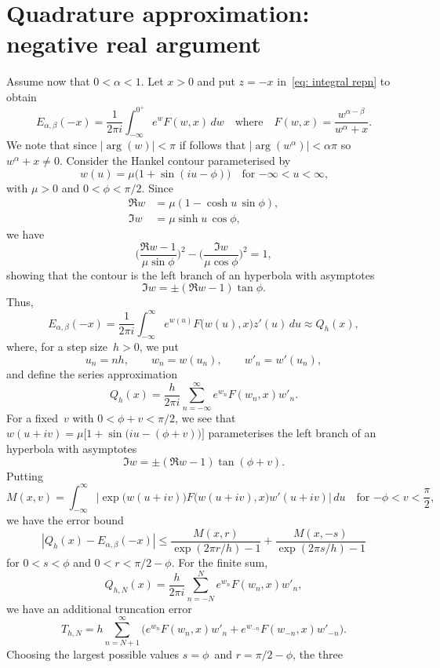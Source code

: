 \documentclass[12pt,a4paper]{article}
\begin{document}
\section{Quadrature approximation: negative real argument}\label{sec: quad neg}
Assume now that $0<\alpha<1$. Let $x>0$ and put $z=-x$ 
in~\eqref{eq: integral repn} to obtain
\[
E_{\alpha,\beta}(-x)=\frac{1}{2\pi i}\int_{-\infty}^{0^+}
    e^wF(w,x)\,dw
\quad\text{where}\quad
F(w,x)=\frac{w^{\alpha-\beta}}{w^\alpha+x}.
\]
We note that since $|\arg(w)|<\pi$ if follows that $|\arg(w^\alpha)|<\alpha\pi$
so $w^\alpha+x\ne0$.  Consider the Hankel contour parameterised 
by~\cite{WeidemanTrefethen2007}
\[
w(u)=\mu\bigl(1+\sin(iu-\phi)\bigr)\quad\text{for $-\infty<u<\infty$,}
\]
with $\mu>0$ and $0<\phi<\pi/2$. Since
\begin{align*}
\Re w&=\mu(1-\cosh u\,\sin\phi),\\
\Im w&=\mu\sinh u\,\cos\phi,
\end{align*}
we have
\[
\biggl(\frac{\Re w-1}{\mu\sin\phi}\biggr)^2
    -\biggl(\frac{\Im w}{\mu\cos\phi}\biggr)^2=1,
\]
showing that the contour is the left branch of an hyperbola with asymptotes
\[
\Im w=\pm(\Re w-1)\tan\phi.
\]
Thus,
\[
E_{\alpha,\beta}(-x)=\frac{1}{2\pi i}\int_{-\infty}^\infty 
e^{w(u)}F\bigl(w(u),x\bigr)z'(u)\,du\approx Q_h(x),
\]
where, for a step size~$h>0$, we put
\[
u_n=nh,\qquad w_n=w(u_n),\qquad w'_n=w'(u_n),
\]
and define the series approximation
\[
Q_h(x)=\frac{h}{2\pi i}\sum_{n=-\infty}^\infty e^{w_n}F(w_n,x)w'_n.
\]
For a fixed~$v$ with $0<\phi+v<\pi/2$, we see that
$w(u+iv)=\mu\bigl[1+\sin(iu-(\phi+v)\bigr)\bigr]$ parameterises the left 
branch of an hyperbola with asymptotes
\[
\Im w=\pm(\Re w-1)\tan(\phi+v).
\]
Putting
\[
M(x,v)=\int_{-\infty}^\infty\bigl|\exp\bigl(w(u+iv)\bigr)
    F\bigl(w(u+iv),x\bigr)w'(u+iv)\bigr|\,du
    \quad\text{for $-\phi<v<\frac{\pi}{2}$,}
\]
we have the error bound~\cite[Theorem~2.1]{WeidemanTrefethen2007}
\begin{equation}\label{eq: Qh error}
|Q_h(x)-E_{\alpha,\beta}(-x)|\le\frac{M(x,r)}{\exp(2\pi r/h)-1}
    +\frac{M(x,-s)}{\exp(2\pi s/h)-1}
\end{equation}
for $0<s<\phi$ and $0<r<\pi/2-\phi$.  For the finite sum,
\begin{equation}\label{eq: Q_hN}
Q_{h,N}(x)=\frac{h}{2\pi i}\sum_{n=-N}^N e^{w_n}F(w_n,x)w'_n,
\end{equation}
we have an additional truncation error
\[
T_{h,N}=h\sum_{n=N+1}^\infty\bigl(e^{w_n}F(w_n,x)w'_n
    +e^{w_{-n}}F(w_{-n},x)w'_{-n}\bigr).
\]
Choosing the largest possible values $s=\phi$~and $r=\pi/2-\phi$, the three
\end{document}
